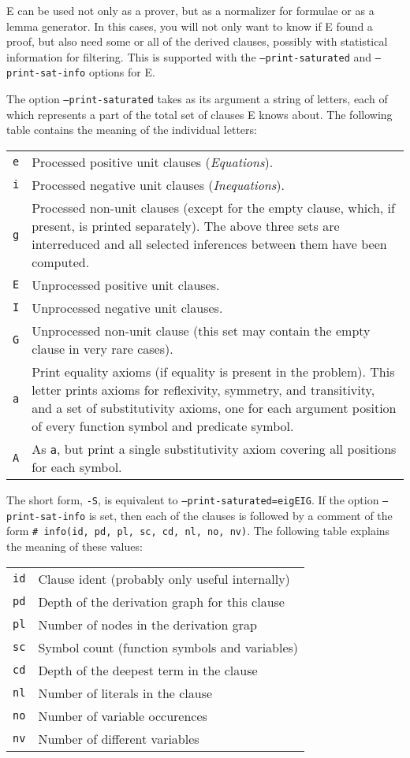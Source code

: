 \documentclass{article}
\begin{document}
E can be used not only as a prover, but as a normalizer for formulae
or as a lemma generator. In this cases, you will not only want to know
if E found a proof, but also need some or all of the derived clauses,
possibly with statistical information for filtering. This is supported
with the \texttt{--print-saturated} and \texttt{--print-sat-info}
options for E.

The option \texttt{--print-saturated} takes as its argument a string
of letters, each of which represents a part of the total set of
clauses E knows about. The following table contains the meaning of the
individual letters:

\begin{tabular}{lp{9cm}}
  \texttt{e} & Processed positive unit clauses (\emph{Equations}).\\ 
  \texttt{i} & Processed negative unit clauses (\emph{Inequations}).\\ 
  \texttt{g} & Processed non-unit clauses (except for the empty
  clause, which, if present, is printed separately). The above three
  sets are interreduced and all selected inferences between them have
  been computed.\\ 
  \texttt{E} & Unprocessed positive unit clauses.\\ 
  \texttt{I} & Unprocessed negative unit clauses.\\ 
  \texttt{G} & Unprocessed non-unit clause (this set may contain the
  empty clause in very rare cases).\\ 
  \texttt{a} & Print equality axioms (if equality is present in the
  problem). This letter prints axioms for reflexivity, symmetry, and
  transitivity, and a set of substitutivity axioms, one for each
  argument position of every function symbol and predicate symbol.\\
  \texttt{A} & As \texttt{a}, but print a single substitutivity axiom
  covering all positions for each symbol.\\
\end{tabular}

The short form, \texttt{-S}, is equivalent to
\texttt{--print-saturated=eigEIG}. If the option
\texttt{--print-sat-info} is set, then each of the clauses is followed
by a comment of the form \texttt{\# info(id, pd, pl, sc, cd, nl,
  no, nv)}. The following table explains the meaning of these values:

\begin{tabular}{lp{10cm}}
\texttt{id} & Clause ident (probably only useful internally) \\
\texttt{pd} & Depth of the derivation graph for this clause \\
\texttt{pl} & Number of nodes in the derivation grap \\
\texttt{sc} & Symbol count (function symbols and variables) \\
\texttt{cd} & Depth of the deepest term in the clause \\
\texttt{nl} & Number of literals in the clause \\
\texttt{no} & Number of variable occurences \\
\texttt{nv} & Number of different variables \\
\end{tabular}
\end{document}
